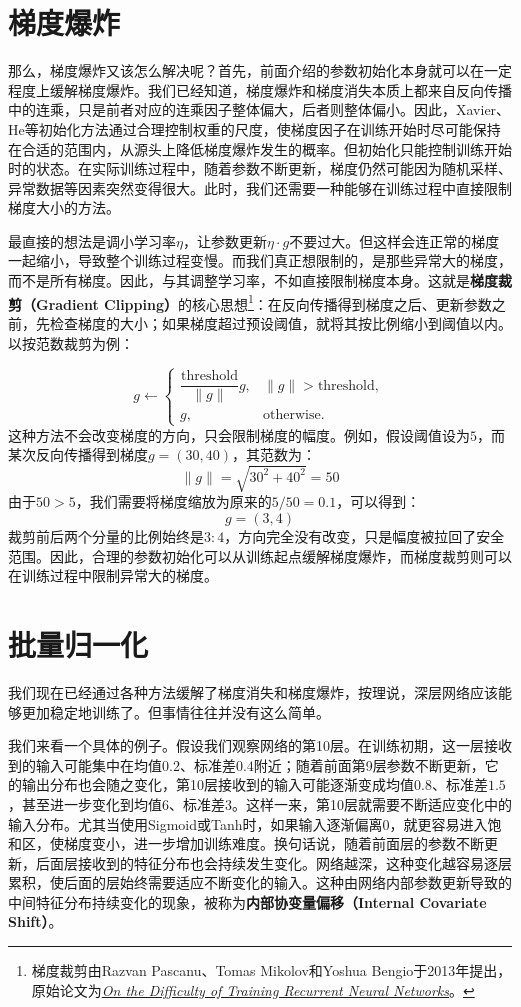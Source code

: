 \section{梯度爆炸}

那么，梯度爆炸又该怎么解决呢？首先，前面介绍的参数初始化本身就可以在一定程度上缓解梯度爆炸。我们已经知道，梯度爆炸和梯度消失本质上都来自反向传播中的连乘，只是前者对应的连乘因子整体偏大，后者则整体偏小。因此，Xavier、He等初始化方法通过合理控制权重的尺度，使梯度因子在训练开始时尽可能保持在合适的范围内，从源头上降低梯度爆炸发生的概率。但初始化只能控制训练开始时的状态。在实际训练过程中，随着参数不断更新，梯度仍然可能因为随机采样、异常数据等因素突然变得很大。此时，我们还需要一种能够在训练过程中直接限制梯度大小的方法。

最直接的想法是调小学习率$\eta$，让参数更新$\eta\cdot g$不要过大。但这样会连正常的梯度一起缩小，导致整个训练过程变慢。而我们真正想限制的，是那些异常大的梯度，而不是所有梯度。因此，与其调整学习率，不如直接限制梯度本身。这就是\textbf{梯度裁剪（Gradient Clipping）}的核心思想\footnote{梯度裁剪由Razvan Pascanu、Tomas Mikolov和Yoshua Bengio于2013年提出，原始论文为\href{https://proceedings.mlr.press/v28/pascanu13.pdf}{\textit{On the Difficulty of Training Recurrent Neural Networks}}。}：在反向传播得到梯度之后、更新参数之前，先检查梯度的大小；如果梯度超过预设阈值，就将其按比例缩小到阈值以内。以按范数裁剪为例：

$$
g\leftarrow
\begin{cases}
    \dfrac{\text{threshold}}{\|g\|}g,&\|g\|>\text{threshold},\\
    g,&\text{otherwise}.
\end{cases}
$$
这种方法不会改变梯度的方向，只会限制梯度的幅度。例如，假设阈值设为$5$，而某次反向传播得到梯度$g=(30,40)$，其范数为：
$$
\|g\|=\sqrt{30^2+40^2}=50
$$
由于$50>5$，我们需要将梯度缩放为原来的$5/50=0.1$，可以得到：
$$
g=(3,4)
$$
裁剪前后两个分量的比例始终是$3:4$，方向完全没有改变，只是幅度被拉回了安全范围。因此，合理的参数初始化可以从训练起点缓解梯度爆炸，而梯度裁剪则可以在训练过程中限制异常大的梯度。

\section{批量归一化}

我们现在已经通过各种方法缓解了梯度消失和梯度爆炸，按理说，深层网络应该能够更加稳定地训练了。但事情往往并没有这么简单。

我们来看一个具体的例子。假设我们观察网络的第10层。在训练初期，这一层接收到的输入可能集中在均值$0.2$、标准差$0.4$附近；随着前面第9层参数不断更新，它的输出分布也会随之变化，第10层接收到的输入可能逐渐变成均值$0.8$、标准差$1.5$，甚至进一步变化到均值$6$、标准差$3$。这样一来，第10层就需要不断适应变化中的输入分布。尤其当使用Sigmoid或Tanh时，如果输入逐渐偏离$0$，就更容易进入饱和区，使梯度变小，进一步增加训练难度。换句话说，随着前面层的参数不断更新，后面层接收到的特征分布也会持续发生变化。网络越深，这种变化越容易逐层累积，使后面的层始终需要适应不断变化的输入。这种由网络内部参数更新导致的中间特征分布持续变化的现象，被称为\textbf{内部协变量偏移（Internal Covariate Shift）}。

